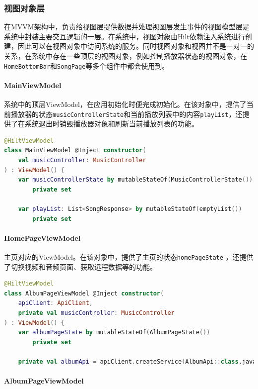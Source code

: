 \documentclass[main.tex]{subfiles}
\begin{document}
\subsubsection{视图对象层}

在MVVM架构中，负责给视图层提供数据并处理视图层发生事件的视图模型层是系统中封装主要交互逻辑的一层。在系统中，视图对象由Hilt依赖注入系统进行创建，因此可以在视图对象中访问系统的服务。同时视图对象和视图并不是一对一的关系，在系统中存在一些顶层的视图对象，例如控制播放器状态的视图对象，在\texttt{HomeBottomBar}和\texttt{SongPage}等多个组件中都会使用到。

\paragraph{MainViewModel}

系统中的顶层ViewModel，在应用初始化时便完成初始化。在该对象中，提供了当前播放器的状态\texttt{musicControllerState}和当前播放列表中的内容\texttt{playList}，还提供了在系统退出时销毁播放器对象和刷新当前播放列表的功能。

\begin{lstlisting}[language=Kotlin]
@HiltViewModel
class MainViewModel @Inject constructor(
    val musicController: MusicController
) : ViewModel() {
    var musicControllerState by mutableStateOf(MusicControllerState())
        private set

    var playList: List<SongResponse> by mutableStateOf(emptyList())
        private set
\end{lstlisting}

\paragraph{HomePageViewModel} 

主页对应的ViewModel。在该对象中，提供了主页的状态\texttt{homePageState}
，还提供了切换视频和音频页面、获取远程数据等的功能。

\begin{lstlisting}[language=Kotlin]
@HiltViewModel
class AlbumPageViewModel @Inject constructor(
    apiClient: ApiClient,
    private val musicController: MusicController
) : ViewModel() {
    var albumPageState by mutableStateOf(AlbumPageState())
        private set

    private val albumApi = apiClient.createService(AlbumApi::class.java)
\end{lstlisting}

\paragraph{AlbumPageViewModel} 
\end{document}
